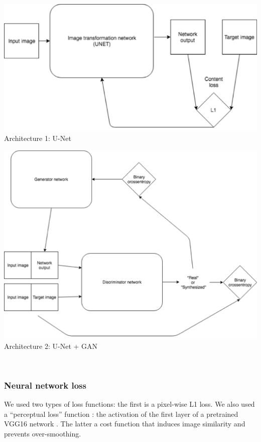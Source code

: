 \documentclass[a0, portrait]{a0poster}
\begin{document}
\begin{multicols}{2}
\begin{minipage}[b]{\linewidth}
\begin{minipage}[b]{0.45\linewidth}
\includegraphics[width=\linewidth]{arch1.png}
\center Architecture 1: U-Net
\end{minipage}
\vspace{0.05\linewidth}
\begin{minipage}[b]{0.45\linewidth}
\includegraphics[width=\linewidth]{arch2.png}
\center Architecture 2: U-Net + GAN
\end{minipage}
\end{minipage}
\\

\subsubsection*{Neural network loss}

We used two types of loss functions: the first is a pixel-wise L1 loss.
We also used a “perceptual loss” function \cite{Johnson2016-ac}: the
activation of the first layer of a pretrained VGG16 network
\cite{Simonyan2014-ua}. The latter a cost function that induces image
similarity and prevents over-smoothing.


\end{multicols}
\end{document}
